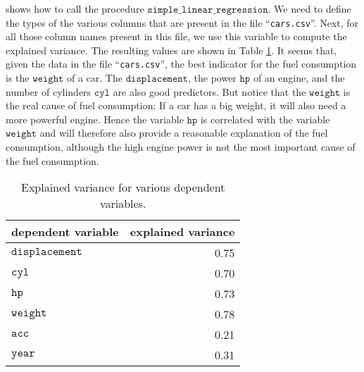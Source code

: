  shows how to call the procedure
$\mathtt{simple\_linear\_regression}$.  We need to define the types of the various columns that are present in
the file ``\texttt{cars.csv}''.  Next, for all those column names present in this file, we use this variable to
compute the explained variance.  The resulting values are shown in Table \ref{tab:explained-variance}.  It
seems that, given the data in the file ``\texttt{cars.csv}'', the best indicator for the fuel consumption is
the $\mathtt{weight}$ of a car.  The $\mathtt{displacement}$, the power $\mathtt{hp}$ of an engine, and the
number of cylinders $\mathtt{cyl}$ are also
good predictors.  But notice that the $\mathtt{weight}$ is the real cause of fuel consumption:  If a car
has a big weight, it will also need a more powerful engine.  Hence the variable $\mathtt{hp}$ is correlated
with the variable $\mathtt{weight}$ and will therefore also provide a reasonable explanation of the fuel
consumption, although the high engine power is  not the most important cause of the fuel consumption.


\begin{table}
  \centering
  \begin{tabular}{|l|r|}
  \hline
  dependent variable      & explained variance   \\
  \hline
  \hline
  $\mathtt{displacement}$ & 0.75                 \\
  \hline
  $\mathtt{cyl}$          & 0.70                 \\
  \hline
  $\mathtt{hp}$           & 0.73                 \\
  \hline
  $\mathtt{weight}$       & 0.78                 \\
  \hline
  $\mathtt{acc}$          & 0.21                 \\
  \hline
  $\mathtt{year}$         & 0.31                 \\
  \hline
  \end{tabular}
  \caption[explained variance]{Explained variance for various dependent variables.}
  \label{tab:explained-variance}
\end{table}
\pagebreak


